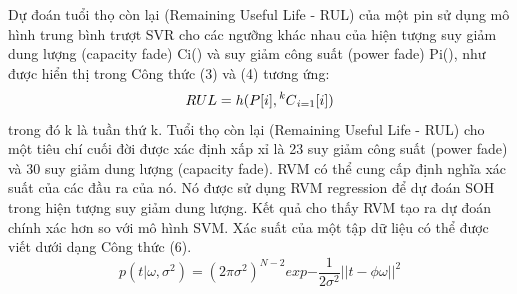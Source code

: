 \documentclass[a4paper,13pt]{article}
\newcommand\Mycomb[2][^n]{\prescript{#1\mkern-0.5mu}{}C_{#2}}
\theoremstyle{mytheor}
\begin{document}
Dự đoán tuổi thọ còn lại (Remaining Useful Life - RUL) của một pin sử dụng mô hình trung bình trượt SVR cho các ngưỡng khác nhau của hiện tượng suy giảm dung lượng (capacity fade) Ci() và suy giảm công suất (power fade) Pi(), như được hiển thị trong Công thức (3) và (4) tương ứng:\\
\[RUL = h(P[i],\Mycomb[k]{i=1}[i]) \]
trong đó k là tuần thứ k. Tuổi thọ còn lại (Remaining Useful Life - RUL) cho một tiêu chí cuối đời được xác định xấp xỉ là 23 suy giảm công suất (power fade) và 30 suy giảm dung lượng (capacity fade).
RVM có thể cung cấp định nghĩa xác suất của các đầu ra của nó. Nó được sử dụng RVM regression để dự đoán SOH trong hiện tượng suy giảm dung lượng. Kết quả cho thấy RVM tạo ra dự đoán chính xác hơn so với mô hình SVM. Xác suất của một tập dữ liệu có thể được viết dưới dạng Công thức (6).\\

\[p(t|\omega, \sigma^2) = (2\pi\sigma^2)^{N-2} exp{- \frac{1}{2\sigma^2}||t -\phi\omega||^2}  \]
\end{document}
